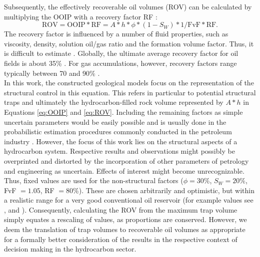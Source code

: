         Subsequently, the effectively recoverable oil volumes (ROV) can be calculated by multiplying the OOIP with a recovery factor RF \citep{dean2007volumetric, morton1993development}:
        \begin{equation}\label{eq:ROV}
                \text{ROV}= \text{OOIP} * \text{RF} = A * h * \phi * (1 - S_W) * 1/\text{FvF} * \text{RF}.
        \end{equation}
        The recovery factor is influenced by a number of fluid properties, such as viscosity, density, solution oil/gas ratio and the formation volume factor. Thus, it is difficult to estimate \citep{dean2007volumetric}. Globally, the ultimate average recovery factor for oil fields is about 35\% \citep{labastie2011increasingRF}. For gas accumulations, however, recovery factors range typically between 70 and 90\% \citep{dean2007volumetric}.\\
        In this work, the constructed geological models focus on the representation of the structural control in this equation. This refers in particular to potential structural traps and ultimately the hydrocarbon-filled rock volume represented by $A * h$ in Equations \ref{eq:OOIP} and \ref{eq:ROV}.
        Including the remaining factors as simple uncertain parameters would be easily possible and is usually done in the probabilistic estimation procedures commonly conducted in the petroleum industry \citep{wim2001guidelines, murtha1997monte, mudford2000valuing}. However, the focus of this work lies on the structural aspects of a hydrocarbon system. Respective results and observations might possibly be overprinted and distorted by the incorporation of other parameters of petrology and engineering as uncertain. Effects of interest might become unrecognizable. Thus, fixed values are used for the non-structural factors ($\phi=30\%$, $S_W=20\%$, FvF $=1.05$, RF $= 80\%$). These are chosen arbitrarily and optimistic, but within a realistic range for a very good conventional oil reservoir (for example values see \citet{morton1993development}, \citet{ahmed2011advanced} and \citet{dandekar2013petroleum}). Consequently, calculating the ROV from the maximum trap volume simply equates a rescaling of values, as proportions are conserved. However, we deem the translation of trap volumes to recoverable oil volumes as appropriate for a formally better consideration of the results in the respective context of decision making in the hydrocarbon sector.\\
